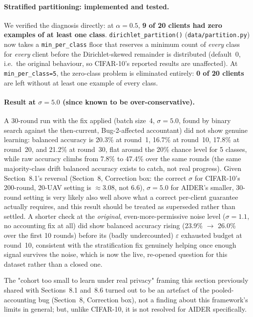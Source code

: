 \documentclass[12pt,a4paper]{article}
\begin{document}
\paragraph{Stratified partitioning: implemented and tested.} We verified
the diagnosis directly: at $\alpha=0.5$, \textbf{9 of 20 clients had zero
examples of at least one class}. \texttt{dirichlet\_partition()}
(\texttt{data/partition.py}) now takes a \texttt{min\_per\_class} floor that
reserves a minimum count of \emph{every} class for \emph{every} client
before the Dirichlet-skewed remainder is distributed (default~0, i.e.\ the
original behaviour, so CIFAR-10's reported results are unaffected). At
\texttt{min\_per\_class=5}, the zero-class problem is eliminated entirely:
\textbf{0 of 20 clients} are left without at least one example of every
class.

\paragraph{Result at $\sigma=5.0$ (since known to be over-conservative).}
A 30-round run with the fix applied (batch size~4, $\sigma=5.0$, found
by binary search against the then-current, Bug-2-affected accountant) did
not show genuine learning: balanced accuracy is 20.3\% at round~1, 16.7\%
at round~10, 17.8\% at round~20, and 21.2\% at round~30, flat around
the 20\% chance level for 5 classes, while raw accuracy climbs from 7.8\%
to 47.4\% over the same rounds (the same majority-class drift balanced
accuracy exists to catch, not real progress). Given Section~8.1's reversal
(Section~8, Correction box: the correct $\sigma$ for CIFAR-10's 200-round,
20-UAV setting is $\approx$3.08, not $6.6$), $\sigma=5.0$ for AIDER's
smaller, 30-round setting is very likely also well above what a correct
per-client guarantee actually requires, and this result should be treated
as superseded rather than settled. A shorter check at the \emph{original},
even-more-permissive noise level ($\sigma=1.1$, no accounting fix at all)
did show balanced accuracy rising (23.9\% $\to$ 26.0\% over the first 10
rounds) before its (badly undercounted) $\varepsilon$ exhausted budget at
round~10, consistent with the stratification fix genuinely helping once
enough signal survives the noise, which is now the live, re-opened
question for this dataset rather than a closed one.

The "cohort too small to learn under real privacy" framing this section
previously shared with Sections~8.1 and~8.6 turned out to be an artefact
of the pooled-accounting bug (Section~8, Correction box), not a finding
about this framework's limits in general; but, unlike CIFAR-10, it is
not resolved for AIDER specifically.
\end{document}
